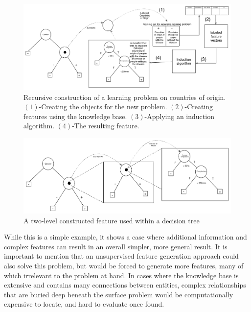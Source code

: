 \documentclass[twoside,11pt]{article}
\theoremstyle{definition}
\begin{document}

\begin{figure}[t]
	\centering
	\includegraphics[width=\linewidth]{fig4_annotated.pdf}
	\caption{Recursive construction of a learning problem on countries of origin. $(1)$-Creating the objects for the new problem. $(2)$-Creating features using the knowledge base. $(3)$-Applying an induction algorithm. $(4)$-The resulting feature.}
	\label{fig:moving_to_lvl2}
\end{figure}

\begin{figure}[t]
	\centering
	\includegraphics[width=\linewidth]{fig3.pdf}
	\caption{A two-level constructed feature used within a decision tree}
	\label{fig:lvl2_tree}
\end{figure}

While this is a simple example, it shows a case where additional information and complex features can result in an overall simpler, more general result. It is important to mention that an unsupervised feature generation approach could also solve this problem, but would be forced to generate more features, many of which irrelevant to the problem at hand. In cases where the knowledge base is extensive and contains many connections between entities, complex relationships that are buried deep beneath the surface problem would be computationally expensive to locate, and hard to evaluate once found.
\end{document}
